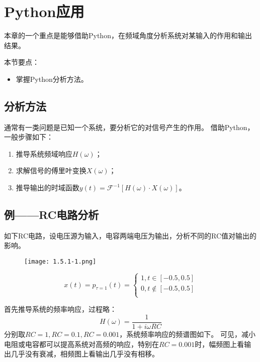 \section{Python应用}

本章的一个重点是能够借助Python，在频域角度分析系统对某输入的作用和输出结果。

本节要点：
\begin{itemize}
    \item 掌握Python分析方法。
\end{itemize}

\subsection{分析方法}

通常有一类问题是已知一个系统，要分析它的对信号产生的作用。
借助Python，一般步骤如下：
\begin{enumerate}
    \item 推导系统频域响应$H\left( \omega \right) $；
    \item 求解信号的傅里叶变换$X\left( \omega \right) $；
    \item 推导输出的时域函数$y\left( t \right) =\mathscr{F} ^{-1}\left[ H\left( \omega \right) \cdot X\left( \omega \right) \right] $。
\end{enumerate}

\subsection{例——RC电路分析}

\begin{example}
如下RC电路，设电压源为输入，电容两端电压为输出，分析不同的RC值对输出的影响。
\begin{figure}[h]
\centering
\texttt{[image: 1.5.1-1.png]}
\end{figure}
\[
x\left( t \right) =p_{\tau =1}\left( t \right) =\begin{cases}
	1,t\in \left[ -0.5,0.5 \right]\\
	0,t\notin \left[ -0.5,0.5 \right]\\
\end{cases}
\]
\end{example}

首先推导系统的频率响应，过程略：
\[
H\left( \omega \right) =\frac{1}{1+i\omega RC}
\]
分别取$RC=1,RC=0.1,RC=0.001$，系统频率响应的频谱图如下。
可见，减小电阻或电容都可以提高系统对高频的响应，特别在$RC=0.001$时，幅频图上看输出几乎没有衰减，相频图上看输出几乎没有相移。

